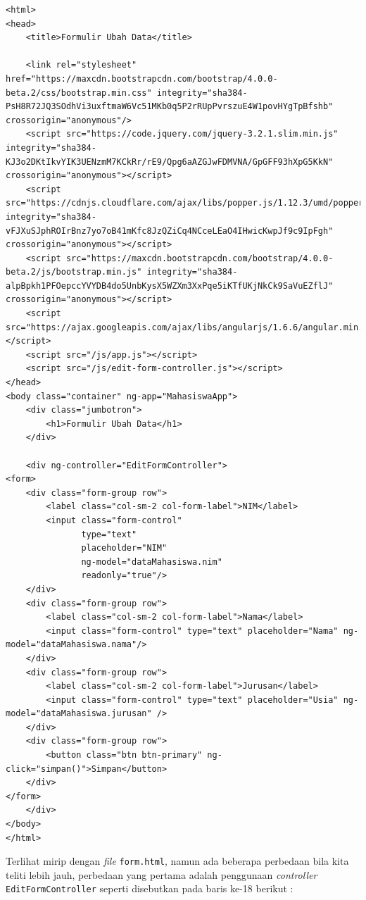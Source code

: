 \begin{enumerate}
	\begin{lstlisting}
<html>
<head>
    <title>Formulir Ubah Data</title>        
    
    <link rel="stylesheet" href="https://maxcdn.bootstrapcdn.com/bootstrap/4.0.0-beta.2/css/bootstrap.min.css" integrity="sha384-PsH8R72JQ3SOdhVi3uxftmaW6Vc51MKb0q5P2rRUpPvrszuE4W1povHYgTpBfshb" crossorigin="anonymous"/>
    <script src="https://code.jquery.com/jquery-3.2.1.slim.min.js" integrity="sha384-KJ3o2DKtIkvYIK3UENzmM7KCkRr/rE9/Qpg6aAZGJwFDMVNA/GpGFF93hXpG5KkN" crossorigin="anonymous"></script>
    <script src="https://cdnjs.cloudflare.com/ajax/libs/popper.js/1.12.3/umd/popper.min.js" integrity="sha384-vFJXuSJphROIrBnz7yo7oB41mKfc8JzQZiCq4NCceLEaO4IHwicKwpJf9c9IpFgh" crossorigin="anonymous"></script>
    <script src="https://maxcdn.bootstrapcdn.com/bootstrap/4.0.0-beta.2/js/bootstrap.min.js" integrity="sha384-alpBpkh1PFOepccYVYDB4do5UnbKysX5WZXm3XxPqe5iKTfUKjNkCk9SaVuEZflJ" crossorigin="anonymous"></script>
    <script src="https://ajax.googleapis.com/ajax/libs/angularjs/1.6.6/angular.min.js"></script>
    <script src="/js/app.js"></script>
    <script src="/js/edit-form-controller.js"></script>
</head>
<body class="container" ng-app="MahasiswaApp">
    <div class="jumbotron">
        <h1>Formulir Ubah Data</h1>
    </div>
    
    <div ng-controller="EditFormController">
<form>
    <div class="form-group row">
        <label class="col-sm-2 col-form-label">NIM</label>
        <input class="form-control" 
               type="text" 
               placeholder="NIM" 
               ng-model="dataMahasiswa.nim" 
               readonly="true"/>
    </div>
    <div class="form-group row">
        <label class="col-sm-2 col-form-label">Nama</label>
        <input class="form-control" type="text" placeholder="Nama" ng-model="dataMahasiswa.nama"/>
    </div>
    <div class="form-group row">
        <label class="col-sm-2 col-form-label">Jurusan</label>
        <input class="form-control" type="text" placeholder="Usia" ng-model="dataMahasiswa.jurusan" />
    </div>    
    <div class="form-group row">
        <button class="btn btn-primary" ng-click="simpan()">Simpan</button>
    </div>
</form>
    </div>
</body>
</html>
	\end{lstlisting}
	
	Terlihat mirip dengan \textit{file} \texttt{form.html}, namun ada beberapa perbedaan bila kita teliti lebih jauh, perbedaan yang pertama adalah penggunaan \textit{controller} \texttt{EditFormController} seperti disebutkan pada baris ke-18 berikut :
	

\end{enumerate}
